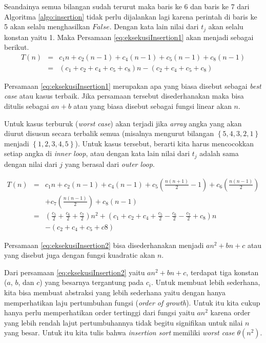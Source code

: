 Seandainya semua bilangan sudah terurut maka baris ke 6 dan baris ke 7 dari Algoritma \ref{algo:insertion} tidak perlu dijalankan lagi karena perintah di baris ke 5 akan selalu menghasilkan $False$. Dengan kata lain nilai dari $t_{j}$ akan selalu konstan yaitu 1. Maka Persamaan \ref{eq:eksekusiInsertion1} akan menjadi sebagai berikut.
\begin{eqnarray}
T(n) & = & c_{1}n + c_2(n-1)+c_4(n-1)+c_5(n-1)+c_8(n-1)
\nonumber \\
 & = & (c_1+c_2+c_4+c_5+c_8)n-(c_2+c_4+c_5+c_8)
\label{eq:totalEksekusi3}
\end{eqnarray}

Persamaan \ref{eq:eksekusiInsertion1} merupakan apa yang biasa disebut sebagai \textit{best case} atau kasus terbaik. Jika persamaan tersebut disederhanakan maka bisa ditulis sebagai $an+b$ atau yang biasa disebut sebagai fungsi linear akan $n$. 

Untuk kasus terburuk (\textit{worst case}) akan terjadi jika \textit{array} angka yang akan diurut disusun secara terbalik semua (misalnya mengurut bilangan $\left\{5,4,3,2,1\right\}$ menjadi $\left\{1,2,3,4,5\right\}$). Untuk kasus tersebut, berarti kita harus mencocokkan setiap angka di \textit{inner loop}, atau dengan kata lain nilai dari $t_{j}$ adalah sama dengan nilai dari $j$ yang berasal dari \textit{outer loop}. 

\begin{eqnarray}
T(n) & = & c_1n + c_2(n-1) + c_4(n-1) + c_5(\frac{n(n+1)}{2}-1) + c_6(\frac{n(n-1)}{2})   \nonumber \\ 
& & + c_7(\frac{n(n-1)}{2})+c_8(n-1) 
\nonumber \\ 
 & = & (\frac{c_5}{2}+\frac{c_6}{2}+\frac{c_7}{2})n^2+(c_1+c_2+c_4+\frac{c_5}{2}-\frac{c_6}{2}-\frac{c_7}{2}+c_8)n \nonumber\\
& & -(c_2+c_4+c_5+c8)
\label{eq:eksekusiInsertion2}
\end{eqnarray}

Persamaan \ref{eq:eksekusiInsertion2} bisa disederhanakan menjadi $an^2+bn+c$ atau yang disebut juga dengan fungsi kuadratic akan $n$. 

Dari persamaan \ref{eq:eksekusiInsertion2} yaitu $an^2+bn+c$, terdapat tiga konstan ($a$, $b$, dan $c$) yang besarnya tergantung pada $c_i$. Untuk membuat lebih sederhana, kita bisa membuat abstraksi yang lebih sederhana yaitu dengan hanya memperhatikan laju pertumbuhan fungsi (\textit{order of growth}). Untuk itu kita cukup hanya perlu memperhatikan order tertinggi dari fungsi yaitu $an^2$ karena order yang lebih rendah lajut pertumbuhannya tidak begitu signifikan untuk nilai $n$ yang besar. Untuk itu kita tulis bahwa \textit{insertion sort} memiliki \textit{worst case} $\theta(n^2)$.
